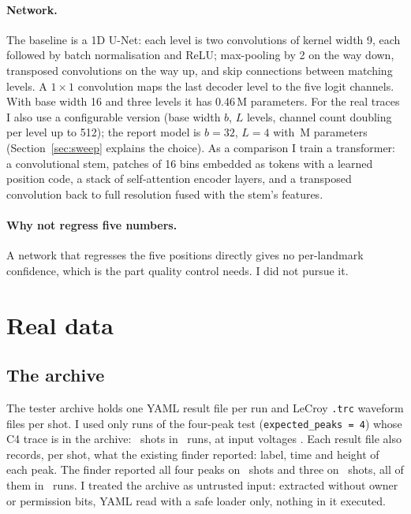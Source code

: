 \documentclass[11pt,a4paper]{article}
\begin{document}
\paragraph{Network.}
The baseline is a 1D U-Net: each level is two convolutions of kernel width 9, each followed by batch
normalisation and ReLU; max-pooling by 2 on the way down, transposed convolutions on the way up, and skip
connections between matching levels. A $1\times1$ convolution maps the last decoder level to the five
logit channels. With base width 16 and three levels it has 0.46\,M parameters. For the real traces I also
use a configurable version (base width $b$, $L$ levels, channel count doubling per level up to 512); the
report model is $b=32$, $L=4$ with \ParamsUnet\,M parameters (Section~\ref{sec:sweep} explains the
choice). As a comparison I train a transformer: a convolutional stem, patches of 16 bins embedded as
tokens with a learned position code, a stack of self-attention encoder layers, and a transposed
convolution back to full resolution fused with the stem's features.

\paragraph{Why not regress five numbers.}
A network that regresses the five positions directly gives no per-landmark confidence, which is the part
quality control needs. I did not pursue it.

\section{Real data}
\label{sec:data}

\subsection{The archive}
The tester archive holds one YAML result file per run and LeCroy \texttt{.trc} waveform files per shot. I
used only runs of the four-peak test (\texttt{expected\_peaks = 4}) whose C4 trace is in the archive:
\NShots\ shots in \NRuns\ runs, at input voltages \Vins. Each result file also records, per shot, what the
existing finder reported: label, time and height of each peak. The finder reported all four peaks on
\NGood\ shots and three on \NFail\ shots, all of them in \NFailRuns\ runs. I treated the archive as
untrusted input: extracted without owner or permission bits, YAML read with a safe loader only, nothing in
it executed.
\end{document}
